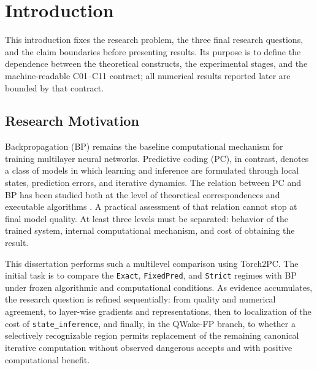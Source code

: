 \chapter{Introduction}
\label{chap:introduction-en}

This introduction fixes the research problem, the three final research questions,
and the claim boundaries before presenting results. Its purpose is to define the
dependence between the theoretical constructs, the experimental stages, and the
machine-readable C01--C11 contract; all numerical results reported later are bounded
by that contract.

\section{Research Motivation}

Backpropagation (BP) remains the baseline computational mechanism for training
multilayer neural networks. Predictive coding (PC), in contrast, denotes a class of
models in which learning and inference are formulated through local states,
prediction errors, and iterative dynamics. The relation between PC and BP has been
studied both at the level of theoretical correspondences and executable algorithms
\cite{rao1999predictive,whittington2017approximation,rosenbaum2022relationship,rosenbaum2025correction}.
A practical assessment of that relation cannot stop at final model quality. At least
three levels must be separated: behavior of the trained system, internal computational
mechanism, and cost of obtaining the result.

This dissertation performs such a multilevel comparison using Torch2PC. The initial
task is to compare the \texttt{Exact}, \texttt{FixedPred}, and \texttt{Strict}
regimes with BP under frozen algorithmic and computational conditions. As evidence
accumulates, the research question is refined sequentially: from quality and
numerical agreement, to layer-wise gradients and representations, then to localization
of the cost of \texttt{state\_inference}, and finally, in the QWake-FP branch, to
whether a selectively recognizable region permits replacement of the remaining
canonical iterative computation without observed dangerous accepts and with positive
computational benefit.

